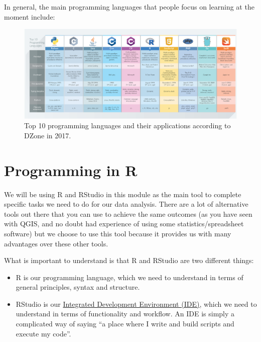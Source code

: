 \documentclass[
]{book}
\providecommand{\tightlist}{%
  \setlength{\itemsep}{0pt}\setlength{\parskip}{0pt}}
\begin{document}
In general, the main programming languages that people focus on learning at the moment include:

\begin{figure}

{\centering \includegraphics[width=0.9\linewidth]{images/w04/programming_languages} 

}

\caption{Top 10 programming languages and their applications according to DZone in 2017.}\label{fig:04-programming-languages}
\end{figure}

\hypertarget{programming-in-r}{%
\section{Programming in R}\label{programming-in-r}}

We will be using R and RStudio in this module as the main tool to complete specific tasks we need to do for our data analysis. There are a lot of alternative tools out there that you can use to achieve the same outcomes (as you have seen with QGIS, and no doubt had experience of using some statistics/spreadsheet software) but we choose to use this tool because it provides us with many advantages over these other tools.

What is important to understand is that R and RStudio are two different things:

\begin{itemize}
\tightlist
\item
  R is our programming language, which we need to understand in terms of general principles, syntax and structure.
\item
  RStudio is our \href{https://en.wikipedia.org/wiki/Integrated_development_environment}{Integrated Development Environment (IDE)}, which we need to understand in terms of functionality and workflow. An IDE is simply a complicated way of saying ``a place where I write and build scripts and execute my code''.
\end{itemize}
\end{document}
